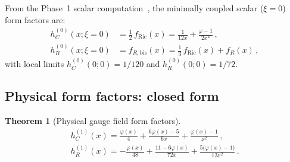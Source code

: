 \documentclass[11pt,a4paper]{article}
\newtheorem{theorem}{Theorem}[section]
\theoremstyle{definition}
\theoremstyle{remark}
\begin{document}
From the Phase~1 scalar computation~\cite{NT1b_scalar},
the minimally coupled scalar ($\xi = 0$) form factors are:
\begin{align}
  h_C^{(0)}(x;\xi=0) &= \frac{1}{2}\,f_{\mathrm{Ric}}(x)
  = \frac{1}{12x} + \frac{\varphi-1}{2x^2}\,,
  \label{eq:hC-ghost}\\
  h_R^{(0)}(x;\xi=0) &= f_{R,\mathrm{bis}}(x)
  = \frac{1}{3}\,f_{\mathrm{Ric}}(x) + f_R(x)\,,
  \label{eq:hR-ghost}
\end{align}
with local limits $h_C^{(0)}(0;0) = 1/120$ and
$h_R^{(0)}(0;0) = 1/72$.


\subsection{Physical form factors: closed form}

\begin{theorem}[Physical gauge field form factors]
\label{thm:final}
\begin{align}
  \boxed{
  h_C^{(1)}(x) = \frac{\varphi(x)}{4}
    + \frac{6\varphi(x) - 5}{6x}
    + \frac{\varphi(x) - 1}{x^2}\,,
  }
  \label{eq:hC-final}\\[8pt]
  \boxed{
  h_R^{(1)}(x) = -\frac{\varphi(x)}{48}
    + \frac{11 - 6\varphi(x)}{72x}
    + \frac{5\bigl(\varphi(x) - 1\bigr)}{12x^2}\,.
  }
  \label{eq:hR-final}
\end{align}
\end{theorem}
\end{document}

